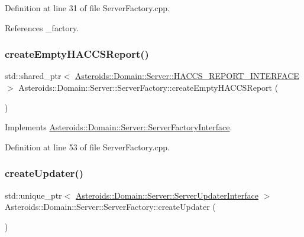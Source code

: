 Definition at line 31 of file Server\+Factory.\+cpp.



References \+\_\+factory.

\mbox{\label{classAsteroids_1_1Domain_1_1Server_1_1ServerFactory_ab02d2953b438f3532f183d640f5391ec}} 
\subsubsection{\texorpdfstring{create\+Empty\+H\+A\+C\+C\+S\+Report()}{createEmptyHACCSReport()}}
{\footnotesize\ttfamily std\+::shared\+\_\+ptr$<$ \hyperlink{classAsteroids_1_1Domain_1_1Server_1_1HACCS__REPORT__INTERFACE}{Asteroids\+::\+Domain\+::\+Server\+::\+H\+A\+C\+C\+S\+\_\+\+R\+E\+P\+O\+R\+T\+\_\+\+I\+N\+T\+E\+R\+F\+A\+CE} $>$ Asteroids\+::\+Domain\+::\+Server\+::\+Server\+Factory\+::create\+Empty\+H\+A\+C\+C\+S\+Report (\begin{DoxyParamCaption}{ }\end{DoxyParamCaption})\hspace{0.3cm}{\ttfamily [virtual]}}



Implements \hyperlink{classAsteroids_1_1Domain_1_1Server_1_1ServerFactoryInterface_a8a91d8b4b3aa1ee18a12fedf9941e98f}{Asteroids\+::\+Domain\+::\+Server\+::\+Server\+Factory\+Interface}.



Definition at line 53 of file Server\+Factory.\+cpp.

\mbox{\label{classAsteroids_1_1Domain_1_1Server_1_1ServerFactory_a151bf3c05e01e2f0d288a3aa97cbfec0}} 
\subsubsection{\texorpdfstring{create\+Updater()}{createUpdater()}}
{\footnotesize\ttfamily std\+::unique\+\_\+ptr$<$ \hyperlink{classAsteroids_1_1Domain_1_1Server_1_1ServerUpdaterInterface}{Asteroids\+::\+Domain\+::\+Server\+::\+Server\+Updater\+Interface} $>$ Asteroids\+::\+Domain\+::\+Server\+::\+Server\+Factory\+::create\+Updater (\begin{DoxyParamCaption}{ }\end{DoxyParamCaption})\hspace{0.3cm}{\ttfamily [virtual]}}



